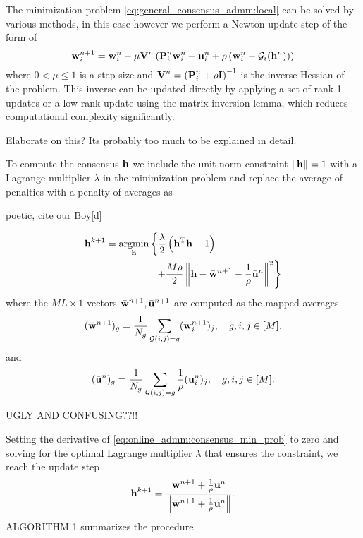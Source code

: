 \documentclass{article}
\newcommand{\h}{\mtxb{h}}
\newcommand{\w}{\mtxb{w}}
\newcommand{\uu}{\mtxb{u}}
\newcommand{\aRho}{\mtxb{P}}
\newcommand{\I}{\mtxb{I}}
\begin{document}
The minimization problem \eqref{eq:general_consensus_admm:local} can be solved by various methods, in this case however we perform a Newton update step of the form of
\begin{equation}
    \w_i^{n+1} = \w_i^{n} - \mu \mtxb{V}^n \left( \aRho_i^n \w_i^n + \uu_i^n + \rho\left(\w_i^n - \mathcal{G}_i(\h^n)\right)\right)\label{eq:online_admm:local_update}
\end{equation}
where \(0  <\mu\leq 1\) is a step size and \(\mtxb{V}^n = \left(\aRho_i^n + \rho \I \right)^{-1}\) is the inverse Hessian of the problem.
This inverse can be updated directly by applying a set of rank-1 updates or a low-rank update using the matrix inversion lemma, which reduces computational complexity significantly.
\begin{attention}
    Elaborate on this? Its probably too much to be explained in detail.
\end{attention}

To compute the consensus \(\h\) we include the unit-norm constraint \(\|\h\| = 1\) with a Lagrange multiplier \(\lambda\) in the minimization problem and replace the average of penalties with a penalty of averages as
\begin{attention}
    poetic, cite our Boy[d]
\end{attention}
\begin{align}
    \h^{k+1} &= \underset{\h}{\operatorname{argmin}} \left\{ \frac{\lambda}{2} \left(\h^\T \h - 1\right)\right.\nonumber\\
    &\left. \qquad \qquad \quad + \frac{M \rho}{2} \left\| \h - \bar{\w}^{n+1} - \frac{1}{\rho} \bar{\uu}^{n} \right\|^2 \right\}\label{eq:online_admm:consensus_min_prob}
\end{align}
where the \(M L \times 1\) vectors \(\bar{\w}^{n+1}, \bar{\uu}^{n+1}\) are computed as the mapped averages
\begin{equation}
    (\bar{\w}^{n+1})_g = \frac{1}{N_g} \sum_{\mathcal{G}(i,j)=g} (\w_i^{n+1})_j,\quad g,i,j \in [M],
\end{equation}
and
\begin{equation}
    (\bar{\uu}^{n})_g = \frac{1}{N_g} \sum_{\mathcal{G}(i,j)=g} \frac{1}{\rho} (\uu_i^{n})_j,\quad g,i,j \in [M].
\end{equation}
\begin{attention}
    UGLY AND CONFUSING??!!
\end{attention}
Setting the derivative of \eqref{eq:online_admm:consensus_min_prob} to zero and solving for the optimal Lagrange multiplier \(\lambda\) that ensures the constraint, we reach the update step
\begin{equation}
    \h^{k+1} = \frac{\bar{\w}^{n+1} + \frac{1}{\rho} \bar{\uu}^{n} }{\left\| \bar{\w}^{n+1} + \frac{1}{\rho} \bar{\uu}^{n} \right\|}.\label{eq:online_admm:consensus_update}
\end{equation}
ALGORITHM 1 summarizes the procedure.
\end{document}
